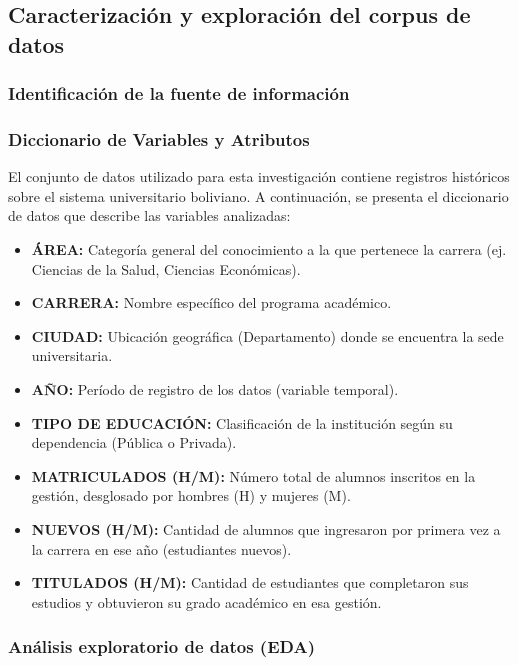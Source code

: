 \documentclass[10pt, twocolumn]{article}
\begin{document}
\subsection{Caracterización y exploración del corpus de datos}

\subsubsection{Identificación de la fuente de información}

\lipsum[1][1]

\subsubsection{Diccionario de Variables y Atributos}

El conjunto de datos utilizado para esta investigación contiene registros históricos sobre el sistema universitario boliviano. A continuación, se presenta el diccionario de datos que describe las variables analizadas:

\begin{itemize}
    \item \textbf{ÁREA:} Categoría general del conocimiento a la que pertenece la carrera (ej. Ciencias de la Salud, Ciencias Económicas).
    \item \textbf{CARRERA:} Nombre específico del programa académico.
    \item \textbf{CIUDAD:} Ubicación geográfica (Departamento) donde se encuentra la sede universitaria.
    \item \textbf{AÑO:} Período de registro de los datos (variable temporal).
    \item \textbf{TIPO DE EDUCACIÓN:} Clasificación de la institución según su dependencia (Pública o Privada).
    \item \textbf{MATRICULADOS (H/M):} Número total de alumnos inscritos en la gestión, desglosado por hombres (H) y mujeres (M).
    \item \textbf{NUEVOS (H/M):} Cantidad de alumnos que ingresaron por primera vez a la carrera en ese año (estudiantes nuevos).
    \item \textbf{TITULADOS (H/M):} Cantidad de estudiantes que completaron sus estudios y obtuvieron su grado académico en esa gestión.
\end{itemize}

\subsubsection{Análisis exploratorio de datos (EDA)}
\end{document}
